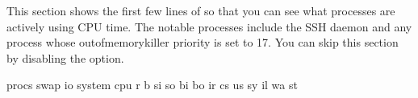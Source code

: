 \documentclass[letterpaper,10pt,english]{sphinxmanual}
\begin{document}
\sphinxAtStartPar
This section shows the first few lines of  so that you can see what
processes are actively using CPU time.  The notable processes include the SSH
daemon and any process whose out\sphinxhyphen{}of\sphinxhyphen{}memory\sphinxhyphen{}killer priority is set to 17. You
can skip this section by disabling the {\hyperref[\detokenize{mariadb-system-summary:cmdoption-mariadb-system-summary-summarize-processes}]{}} option.

\begin{sphinxVerbatim}[commandchars=\\\{\}]
  procs  \PYGZhy{}\PYGZhy{}\PYGZhy{}swap\PYGZhy{}\PYGZhy{} \PYGZhy{}\PYGZhy{}\PYGZhy{}\PYGZhy{}\PYGZhy{}io\PYGZhy{}\PYGZhy{}\PYGZhy{}\PYGZhy{} \PYGZhy{}\PYGZhy{}\PYGZhy{}system\PYGZhy{}\PYGZhy{}\PYGZhy{}\PYGZhy{} \PYGZhy{}\PYGZhy{}\PYGZhy{}\PYGZhy{}\PYGZhy{}\PYGZhy{}\PYGZhy{}\PYGZhy{}cpu\PYGZhy{}\PYGZhy{}\PYGZhy{}\PYGZhy{}\PYGZhy{}\PYGZhy{}\PYGZhy{}\PYGZhy{}
   r  b    si   so    bi    bo     ir     cs  us  sy  il  wa  st
                                              
                                            
                                            
                                            
                                          
\end{sphinxVerbatim}
\end{document}
